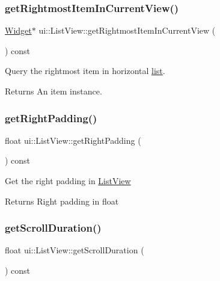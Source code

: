 \subsubsection{\texorpdfstring{get\+Rightmost\+Item\+In\+Current\+View()}{getRightmostItemInCurrentView()}\hspace{0.1cm}{\footnotesize\ttfamily [2/2]}}
{\footnotesize\ttfamily \hyperlink{classui_1_1Widget}{Widget}$\ast$ ui\+::\+List\+View\+::get\+Rightmost\+Item\+In\+Current\+View (\begin{DoxyParamCaption}{ }\end{DoxyParamCaption}) const}



Query the rightmost item in horizontal \hyperlink{protocollist-p}{list}. 

\begin{DoxyReturn}{Returns}
An item instance. 
\end{DoxyReturn}
\mbox{\label{classui_1_1ListView_ad2b4b1c9eceedda8d659058d2d6a92bf}} 
\subsubsection{\texorpdfstring{get\+Right\+Padding()}{getRightPadding()}}
{\footnotesize\ttfamily float ui\+::\+List\+View\+::get\+Right\+Padding (\begin{DoxyParamCaption}{ }\end{DoxyParamCaption}) const}

Get the right padding in \hyperlink{classui_1_1ListView}{List\+View} \begin{DoxyReturn}{Returns}
Right padding in float 
\end{DoxyReturn}
\mbox{\label{classui_1_1ListView_a85116b79e39403d670411684410feef0}} 
\subsubsection{\texorpdfstring{get\+Scroll\+Duration()}{getScrollDuration()}\hspace{0.1cm}{\footnotesize\ttfamily [1/2]}}
{\footnotesize\ttfamily float ui\+::\+List\+View\+::get\+Scroll\+Duration (\begin{DoxyParamCaption}{ }\end{DoxyParamCaption}) const}

